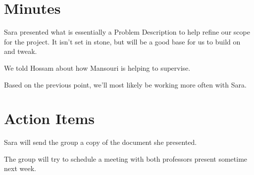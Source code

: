 \documentclass[11pt]{meetingmins}
\begin{document}
    \maketitle

    \section{Minutes}
    \begin{items}
        \item Sara presented what is essentially a Problem Description to help refine our scope for the project. It isn't set in stone, but will be a good base for us to build on and tweak.
        \item We told Hossam about how Mansouri is helping to supervise.
        \item Based on the previous point, we'll most likely be working more often with Sara.
    \end{items}

    \section{Action Items}
    \begin{items}
        \item Sara will send the group a copy of the document she presented.
        \item The group will try to schedule a meeting with both professors present sometime next week.
    \end{items}

    \vspace{1em}

\end{document}
